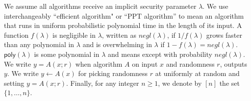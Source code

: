 \vspace{-0.03in}
\noindent We assume all algorithms receive an implicit security parameter $\lambda$. 
We use interchangeably ``efficient algorithm" or ``PPT algorithm'' to mean an algorithm that runs in uniform probabilistic polynomial 
time in the length of its input. A function $f(\lambda)$ is negligible in $\lambda$, written as $\mathit{negl}(\lambda)$, if $1/f(\lambda)$ 
grows faster than any polynomial in $\lambda$ and is overwhelming in $\lambda$ if $1-f(\lambda)=\mathit{negl}(\lambda)$. 
$\mathsf{poly}(\lambda)$ is some polynomial in $\lambda$ and \ewnp means except with probability $\mathit{negl}(\lambda)$.
We write $y = A(x; r)$ when algorithm $A$ on input $x$ and randomness $r$, outputs $y$. We write $y \leftarrow A(x)$ for picking 
randomness $r$ at uniformly at random and setting $y = A(x; r)$. Finally, for any integer $n \geq 1$, we denote by $[n]$ the set $\{1, \ldots, n\}$.
\vspace{-0.05in}
